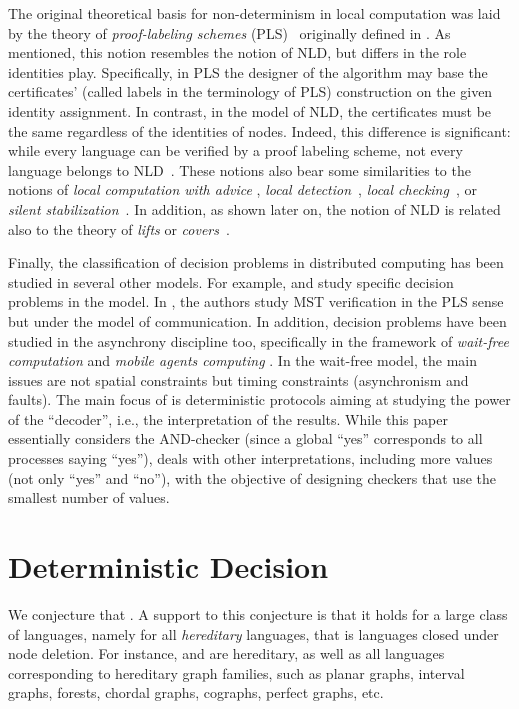 \documentclass{llncs}
\begin{document}
The original theoretical basis for non-determinism in local
computation was laid by the theory of \emph{proof-labeling schemes} (PLS)~\cite{GS11,KK07,KKM11,KKP10} 
originally defined in \cite{KKP10}. As mentioned, 
this notion resembles the notion of NLD, but differs in the role identities play. Specifically, in PLS the designer of the algorithm may base the certificates'
(called labels in the terminology of PLS) construction on the given identity assignment. In contrast, in the model of NLD, the certificates must be the same regardless of the identities of nodes.
Indeed, this difference is significant: while every language can be verified by a proof labeling scheme, not every language belongs to NLD~\cite{FKP11}. These notions also bear some similarities to the notions of \emph{local computation with advice} \cite{DP12,FGIP07,FIP10,FKL07}, 
{\em local detection}~\cite{AKY97},
{\em local checking}~\cite{APV}, or {\em silent stabilization}~\cite{silent}.
In addition, as shown later on, the notion of NLD is related also to the theory of
{\em lifts} or {\em covers}~\cite{A80,Linial01}.

Finally, the classification of decision problems in distributed
computing has been studied in several other models. For example,
\cite{DHKKNPPW} and \cite{KKP11} study specific decision problems in
the  model. In \cite{KKM11}, the authors study MST verification in the PLS sense but under the   model of communication. 
In addition, decision problems have been studied in the asynchrony discipline
too, specifically in the framework of {\em wait-free computation}
\cite{FRT11,FRT12} and {\em mobile agents  computing} \cite{FP12}.
In the wait-free model, the main issues are not spatial constraints but timing
constraints (asynchronism and faults). The main focus of  \cite{FRT12} is
deterministic protocols aiming at studying the power of the ``decoder'',
i.e., the interpretation of the results. While this paper essentially
considers the AND-checker (since a global ``yes'' corresponds to all processes
saying ``yes''), \cite{FRT12} deals with other interpretations,
including more values (not only ``yes'' and ``no''), with the objective of
designing checkers that use the smallest number of values.

\section{Deterministic Decision}
\label{sec:dd}


We conjecture that . A support to this conjecture is that it holds for a large class of languages, namely for all \emph{hereditary} languages, that is languages closed under node deletion. For instance,  and  are hereditary, as well as all languages corresponding to hereditary graph families, such as planar graphs, interval graphs, forests, chordal graphs, cographs, perfect graphs, etc. 
\end{document}
